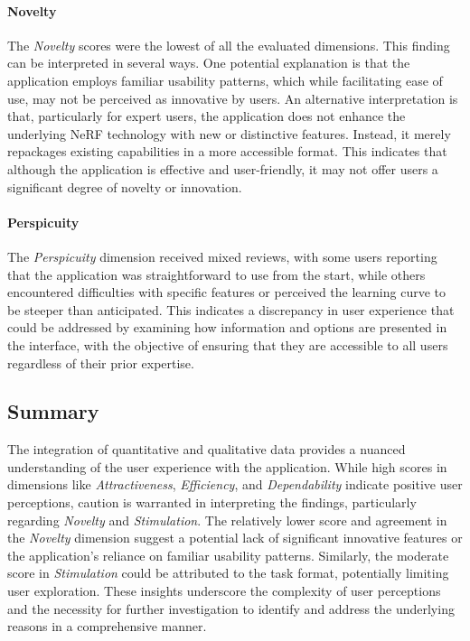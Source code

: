 \paragraph{Novelty}
The \emph{Novelty} scores were the lowest of all the evaluated dimensions. This finding can be interpreted in several ways. 
One potential explanation is that the application employs familiar usability patterns, which while facilitating ease of use, may not be perceived as innovative by users. 
An alternative interpretation is that, particularly for expert users, the application does not enhance the underlying NeRF technology with new or distinctive features. Instead, it merely repackages existing capabilities in a more accessible format. 
This indicates that although the application is effective and user-friendly, it may not offer users a significant degree of novelty or innovation.

\paragraph{Perspicuity}
The \emph{Perspicuity} dimension received mixed reviews, with some users reporting that the application was straightforward to use from the start, while others encountered difficulties with specific features or perceived the learning curve to be steeper than anticipated. 
This indicates a discrepancy in user experience that could be addressed by examining how information and options are presented in the interface, with the objective of ensuring that they are accessible to all users regardless of their prior expertise.

\subsection*{Summary}
\label{subsec:findings:summary}

The integration of quantitative and qualitative data provides a nuanced understanding of the user experience with the application. 
While high scores in dimensions like \emph{Attractiveness}, \emph{Efficiency}, and \emph{Dependability} indicate positive user perceptions, caution is warranted in interpreting the findings, particularly regarding \emph{Novelty} and \emph{Stimulation}. 
The relatively lower score and agreement in the \emph{Novelty} dimension suggest a potential lack of significant innovative features or the application's reliance on familiar usability patterns. 
Similarly, the moderate score in \emph{Stimulation} could be attributed to the task format, potentially limiting user exploration. 
These insights underscore the complexity of user perceptions and the necessity for further investigation to identify and address the underlying reasons in a comprehensive manner.
